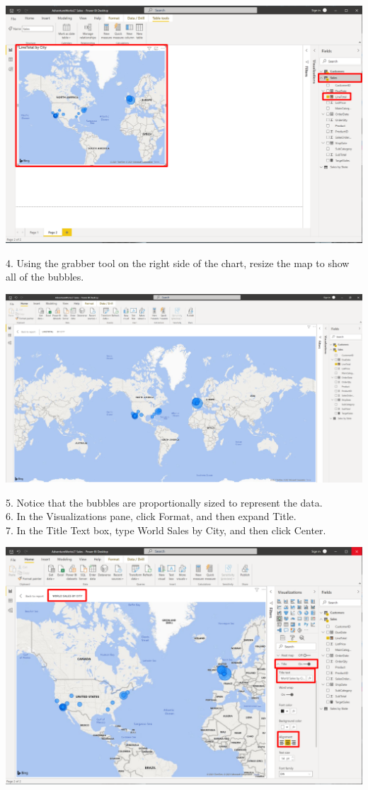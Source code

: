 \documentclass[12pt,letterpaper]{article}
\begin{document}
\begin{center}
    \includegraphics[width=16cm]{img/103.png}
\end{center}
4. Using the grabber tool on the right side of the chart, resize the map to show all of the bubbles.
\begin{center}
    \includegraphics[width=17cm]{img/104.png}
\end{center}
5. Notice that the bubbles are proportionally sized to represent the data.
\\6. In the Visualizations pane, click Format, and then expand Title.
\\7. In the Title Text box, type World Sales by City, and then click Center.
\begin{center}
    \includegraphics[width=17cm]{img/105.png}
\end{center}
\end{document}
